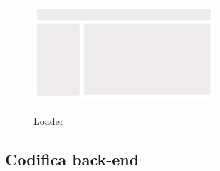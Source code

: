 \begin{figure}[ht]
  \centering
  \includegraphics[width=0.6\textwidth, alt={Skeleton loader di caricamento principale dell'applicazione}]{images/frontend/Loader.jpg}
  \caption{Loader}\label{fig:loader}
\end{figure}
\pagebreak

\subsection{Codifica back-end}\label{subsec:codifica-back-end}



